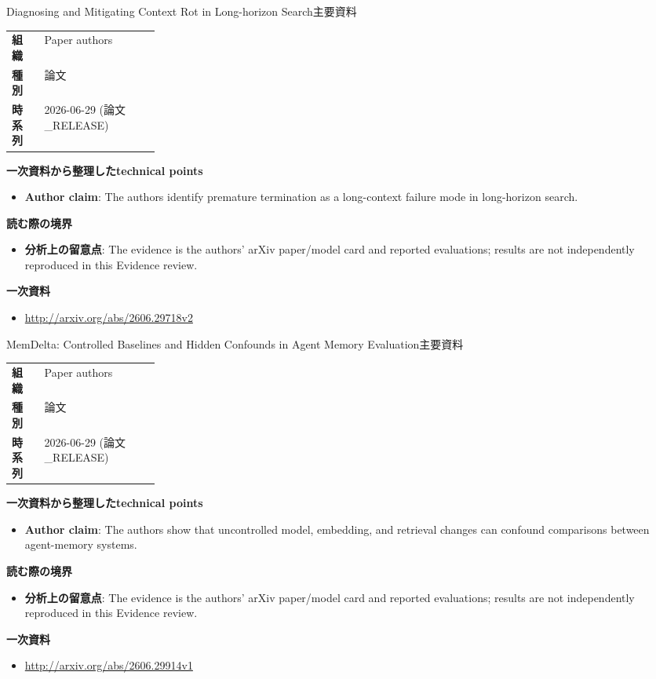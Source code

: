\begin{technicalnote}{Diagnosing and Mitigating Context Rot in Long-horizon Search}{主要資料}
\begin{tabularx}{\linewidth}{@{}>{\bfseries}p{0.22\linewidth}X@{}}
組織 & Paper authors \\
種別 & 論文 \\
時系列 & 2026-06-29 (論文\_RELEASE) \\
\end{tabularx}
\smallskip
{\bfseries 一次資料から整理したtechnical points}
\begin{itemize}[leftmargin=1.5em,itemsep=0.35em]
\item \textbf{Author claim}: The authors identify premature termination as a long-context failure mode in long-horizon search.
\end{itemize}
{\bfseries 読む際の境界}
\begin{itemize}[leftmargin=1.5em,itemsep=0.35em]
\item \textbf{分析上の留意点}: The evidence is the authors' arXiv paper/model card and reported evaluations; results are not independently reproduced in this Evidence review.
\end{itemize}
{\bfseries 一次資料}
\begingroup\sloppy
\begin{itemize}[leftmargin=1.5em,itemsep=0.25em]
\item {\scriptsize\url{http://arxiv.org/abs/2606.29718v2}}
\end{itemize}
\endgroup
\end{technicalnote}
\medskip

\begin{technicalnote}{MemDelta: Controlled Baselines and Hidden Confounds in Agent Memory Evaluation}{主要資料}
\begin{tabularx}{\linewidth}{@{}>{\bfseries}p{0.22\linewidth}X@{}}
組織 & Paper authors \\
種別 & 論文 \\
時系列 & 2026-06-29 (論文\_RELEASE) \\
\end{tabularx}
\smallskip
{\bfseries 一次資料から整理したtechnical points}
\begin{itemize}[leftmargin=1.5em,itemsep=0.35em]
\item \textbf{Author claim}: The authors show that uncontrolled model, embedding, and retrieval changes can confound comparisons between agent-memory systems.
\end{itemize}
{\bfseries 読む際の境界}
\begin{itemize}[leftmargin=1.5em,itemsep=0.35em]
\item \textbf{分析上の留意点}: The evidence is the authors' arXiv paper/model card and reported evaluations; results are not independently reproduced in this Evidence review.
\end{itemize}
{\bfseries 一次資料}
\begingroup\sloppy
\begin{itemize}[leftmargin=1.5em,itemsep=0.25em]
\item {\scriptsize\url{http://arxiv.org/abs/2606.29914v1}}
\end{itemize}
\endgroup
\end{technicalnote}
\medskip

